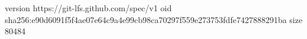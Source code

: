 version https://git-lfs.github.com/spec/v1
oid sha256:e90d6091f5f4ae07e64c9a4e99cb98ca70297f559e273753fdfe7427888291ba
size 80484
